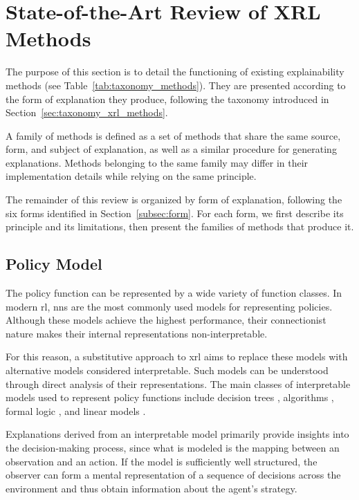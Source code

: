 \section{State-of-the-Art Review of XRL Methods}
\label{sec:state_of_the_art}

The purpose of this section is to detail the functioning of existing explainability methods (see Table~\ref{tab:taxonomy_methods}).
They are presented according to the form of explanation they produce, following the taxonomy introduced in Section~\ref{sec:taxonomy_xrl_methods}.



A family of methods is defined as a set of methods that share the same source, form, and subject of explanation, as well as a similar procedure for generating explanations.
Methods belonging to the same family may differ in their implementation details while relying on the same principle.

The remainder of this review is organized by form of explanation, following the six forms identified in Section~\ref{subsec:form}.
For each form, we first describe its principle and its limitations, then present the families of methods that produce it.

\subsection{Policy Model}
\label{subsec:policy_model}

The policy function can be represented by a wide variety of function classes.
In modern \gls{rl}, \glspl{nn} are the most commonly used models for representing policies.
Although these models achieve the highest performance, their connectionist nature makes their internal representations non-interpretable.

For this reason, a substitutive approach to \gls{xrl} aims to replace these models with alternative models considered interpretable.
Such models can be understood through direct analysis of their representations.
The main classes of interpretable models used to represent policy functions include decision trees \parencite{topin2021iterative}, algorithms \parencite{trivedi2022learning}, formal logic \parencite{payani2019inductive}, and linear models \parencite{pmlr-v108-garreau20a}.

Explanations derived from an interpretable model primarily provide insights into the decision-making process, since what is modeled is the mapping between an observation and an action.
If the model is sufficiently well structured, the observer can form a mental representation of a sequence of decisions across the environment and thus obtain information about the agent's strategy.

